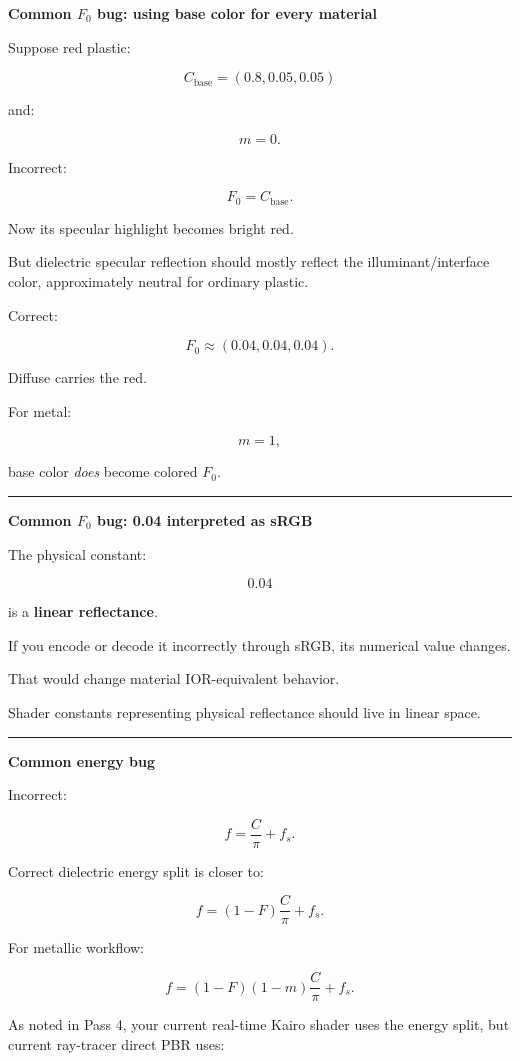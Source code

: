 \textbf{Common \(F_0\) bug: using base color for every material}

Suppose red plastic:

\[
C_{\text{base}}=(0.8,0.05,0.05)
\]

and:

\[
m=0.
\]

Incorrect:

\[
F_0=C_{\text{base}}.
\]

Now its specular highlight becomes bright red.

But dielectric specular reflection should mostly reflect the illuminant/interface color, approximately neutral for ordinary plastic.

Correct:

\[
F_0\approx(0.04,0.04,0.04).
\]

Diffuse carries the red.

For metal:

\[
m=1,
\]

base color \emph{does} become colored \(F_0\).

\begin{center}\rule{0.5\linewidth}{0.5pt}\end{center}

\textbf{Common \(F_0\) bug: 0.04 interpreted as sRGB}

The physical constant:

\[
0.04
\]

is a \textbf{linear reflectance}.

If you encode or decode it incorrectly through sRGB, its numerical value changes.

That would change material IOR-equivalent behavior.

Shader constants representing physical reflectance should live in linear space.

\begin{center}\rule{0.5\linewidth}{0.5pt}\end{center}

\textbf{Common energy bug}

Incorrect:

\[
f=
\frac{C}{\pi}
+
f_s.
\]

Correct dielectric energy split is closer to:

\[
f=
(1-F)
\frac{C}{\pi}
+
f_s.
\]

For metallic workflow:

\[
f=
(1-F)(1-m)
\frac{C}{\pi}
+
f_s.
\]

As noted in Pass 4, your current real-time Kairo shader uses the energy split, but current ray-tracer direct PBR uses:

